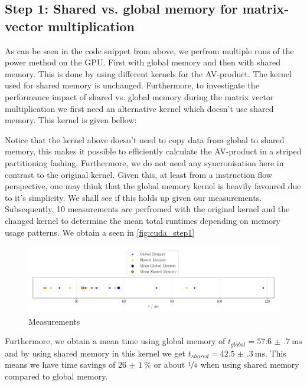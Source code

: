\subsection{Step 1: Shared vs. global memory for matrix-vector multiplication}
As can be seen in the code snippet from above, we perfrom multiple runs of the power method on the GPU. First with global memory and then with shared memory. This is done by using different kernels for the AV-product. The kernel used for shared memory is unchanged.
Furthermore, to investigate the performance impact of shared vs. global memory during the matrix vector multiplication we first need an alternative kernel which doesn't use shared memory. This kernel is given bellow: 

Notice that the kernel above doesn't need to copy data from global to shared memory, this makes it possible to efficiently calculate the AV-product in a striped partitioning fashing. Furthermore, we do not need any syncronisation here in contrast to the original kernel. Given this, at least from a instruction flow perspective, one may think that the global memory kernel is heavily favoured due to it's simplicity. We shall see if this holds up given our measurements. \\ 
Subsequently, 10 measurements are perfromed with the original kernel and the changed kernel to determine the mean total runtimes depending on memory usage patterns. 
We obtain a  seen in \autoref{fig:cuda_step1}
\begin{figure}[H]
    \centering
    \includegraphics[width=\textwidth]{../fig/lab3/step1.png}
    \caption{Measurements }
    \label{fig:cuda_step1}
\end{figure}
Furthermore, we obtain a mean time using global memory of $t_{global} = \SI{57.6(7)}{\milli\second}$ and by using shared memory in this kernel we get $t_{shared} = \SI{42.5(3)}{\milli\second}$. 
This means we have time savings of $\SI{26(1)}{\percent}$ or about $\nicefrac{1}{4}$ when using shared memory compared to global memory. \\

